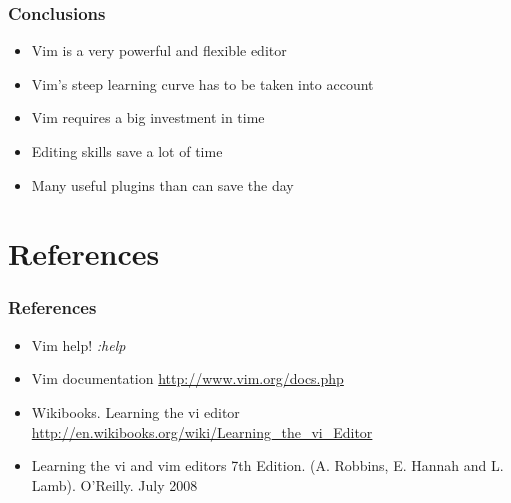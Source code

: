\documentclass{beamer}
\begin{document}
\begin{frame}
\frametitle{Conclusions}

\begin{itemize}
\item Vim is a very powerful and flexible editor
\item Vim's steep learning curve has to be taken into account
\item Vim requires a big investment in time
\item Editing skills save a lot of time
\item Many useful plugins than can save the day
\end{itemize}

\end{frame}


\section{References}

\begin{frame} 
\frametitle{References}

\begin{itemize}
\item Vim help! \textit{:help}
\item Vim documentation \url{http://www.vim.org/docs.php}
\item Wikibooks. Learning the vi editor \url{http://en.wikibooks.org/wiki/Learning\_the\_vi\_Editor}
\item Learning the vi and vim editors 7th Edition. (A. Robbins, E. Hannah and L. Lamb). O'Reilly. July 2008
\end{itemize}

\end{frame}



\end{document}
